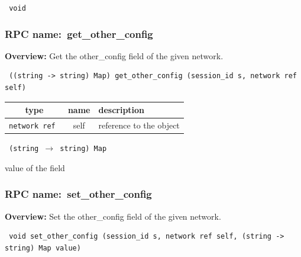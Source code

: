 \vspace{0.3cm}

{\tt 
void
}



\vspace{0.3cm}
\vspace{0.3cm}
\vspace{0.3cm}
\subsubsection{RPC name:~get\_other\_config}

{\bf Overview:} 
Get the other\_config field of the given network.

\begin{verbatim} ((string -> string) Map) get_other_config (session_id s, network ref self)\end{verbatim}



 
\vspace{0.3cm}
\begin{tabular}{|c|c|p{7cm}|}
 \hline
{\bf type} & {\bf name} & {\bf description} \\ \hline
{\tt network ref } & self & reference to the object \\ \hline 

\end{tabular}

\vspace{0.3cm}

{\tt 
(string $\rightarrow$ string) Map
}


value of the field
\vspace{0.3cm}
\vspace{0.3cm}
\vspace{0.3cm}
\subsubsection{RPC name:~set\_other\_config}

{\bf Overview:} 
Set the other\_config field of the given network.

\begin{verbatim} void set_other_config (session_id s, network ref self, (string -> string) Map value)\end{verbatim}



